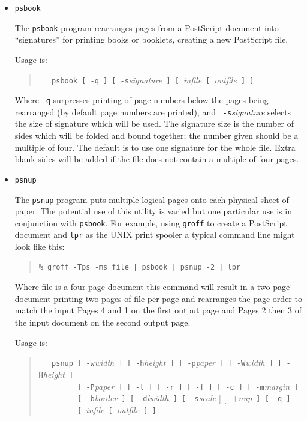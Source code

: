 \documentclass[twoside,11pt]{article}
\begin{document}
\begin{itemize}

\item {\tt psbook}

The {\tt psbook} program rearranges pages from a PostScript document
into ``signatures'' for printing books or booklets, creating a new
PostScript file. 

Usage is: 

\begin{quote}
\verb+   psbook [ -q ] [ -s+{\em signature}\verb+ ] [ +{\em infile}\verb+ [ +{\em outfile}\verb+ ] ]+ 
\end{quote}

Where {\tt -q} surpresses printing of page numbers below the pages
being rearranged (by default page numbers are printed), and {\tt
-s}{\em signature} selects the size of signature which will be used.
The signature size is the number of sides which will be folded and
bound together; the number given should be a multiple of four. The
default is to use one signature for the whole file. Extra blank sides
will be added if the file does not contain a multiple of four pages.  

\item {\tt psnup}

The {\tt psnup} program puts multiple logical pages onto each physical
sheet of paper. The potential use of this utility is varied but one
particular use is in conjunction with {\tt psbook}. For example, using
{\tt groff} to create a PostScript document and {\tt lpr} as the UNIX
print spooler a typical command line might look like this: 

\small
\begin{quote}
\begin{verbatim}
% groff -Tps -ms file | psbook | psnup -2 | lpr
\end{verbatim}
\end{quote}
\normalsize

Where file is a four-page document this command will result in a
two-page document printing two pages of file per page and rearranges
the page order to match the input Pages 4 and 1 on the first output
page and Pages 2 then 3 of the input document on the second output
page. 

Usage is:

\begin{quote}
\verb+   psnup [ -w+{\em width}\verb+ ] [ -h+{\em height}\verb+ ] [ -p+{\em paper}\verb+ ] [ -W+{\em width}\verb+ ] [ -H+{\em height}\verb+ ]+\\
\verb+         [ -P+{\em paper}\verb+ ] [ -l ] [ -r ] [ -f ] [ -c ] [ -m+{\em margin}\verb+ ]+\\
\verb+         [ -b+{\em border}\verb+ ] [ -d+{\em lwidth}\verb+ ] [ -s+{\em scale} ] [ -+{\em nup}\verb+ ] [ -q ]+\\
\verb+         [ +{\em infile}\verb+ [ +{\em outfile}\verb+ ] ]+ 
\end{quote}


\end{itemize}
\end{document}
